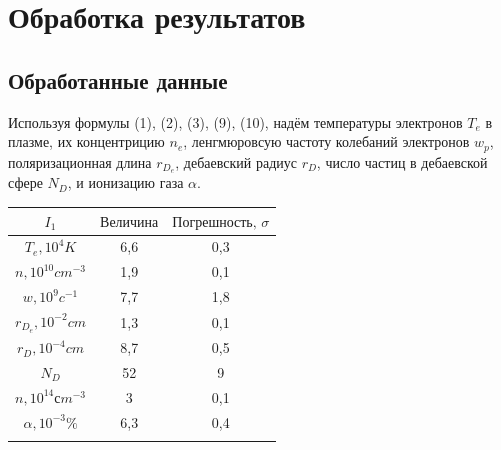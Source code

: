 \section{Обработка результатов}
\subsection{Обработанные данные}
\par Используя формулы (1), (2), (3), (9), (10), надём температуры электронов $T_e$ в плазме, их концентрицию $n_e$, ленгмюровсую частоту колебаний электронов $w_p$, поляризационная длина $r_{D_e}$, дебаевский радиус $r_D$, число частиц в дебаевской сфере $N_D$, и ионизацию газа $\alpha$.
\begin{table}[h!]
\centering
\begin{tabular}{|c|c|c|} \hline
$I_1$ & $\text{Величина}$   & $ \text{Погрешность, } \sigma$  \\ \hline
$T_e, 10^4 K$                          & 6,6  & 0,3                    \\ \hline
$n, 10^{10} cm^{-3}$ & 1,9  & 0,1                    \\ \hline
$w, 10^9 c^{-1}   $& 7,7  & 1,8                    \\ \hline
$r_{D_e}, 10^{-2} cm$           & 1,3  & 0,1                    \\ \hline
$r_{D}, 10^{-4} cm $             & 8,7  & 0,5                    \\ \hline
$N_D $                                                 & 52   & 9                      \\ \hline
$n, 10^{14} сm^{-3} $& 3    & 0,1                    \\ \hline
$\alpha, 10^{-3}\%  $& 6,3  & 0,4                    \\ \hline

\\ \hline


\end{tabular}
\end{table}
